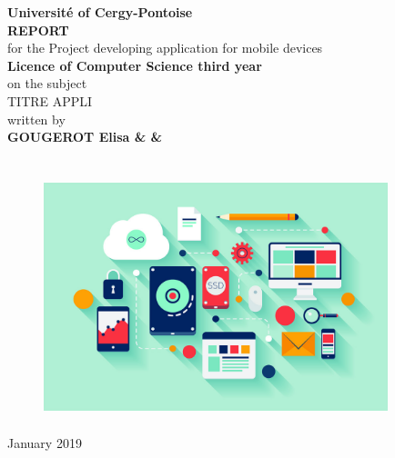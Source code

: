 
\begin{titlepage}{
    \begin{center}
        \vspace* {25mm}
        {\Large \textbf {Université of Cergy-Pontoise}} \\
        \vspace* {10mm}
        {\Large \textbf {REPORT}} \\
        \vspace* {10mm}
        for the Project developing application for mobile devices\\
        \textbf {Licence of Computer Science third year} \\
        \vspace* {10mm}
        	on the subject \\
        \vspace* {10mm}
	{\Huge \textsf{TITRE APPLI}} \\
        \vspace* {10mm}
 	written by \\
        \vspace* {10mm}
        {\Large \textbf {GOUGEROT Elisa \& \& }} \\
            \vspace* {5mm}
        {\Large \textbf {}} \\
				\vspace* {10mm}
        	\begin{figure}[h]
        	    \centering \includegraphics[width=10cm, height=7cm]{images/intro.jpg}
        	    \label{fig:logo}
        	\end{figure}
        \date{} January 2019
        \vspace* {10mm}
	\end{center}
}
\end{titlepage}